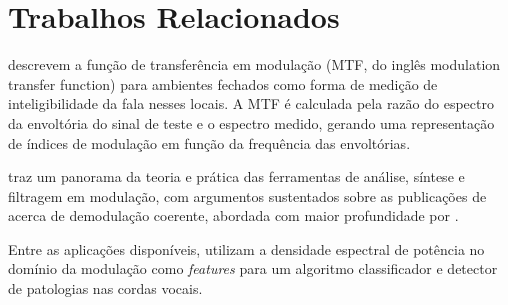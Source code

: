 \section{Trabalhos Relacionados}
\citet{houtgast1973} descrevem a função de transferência em modulação
(MTF, do inglês modulation
transfer function) para ambientes fechados como forma de medição de
inteligibilidade da fala nesses locais. A MTF é calculada pela razão do espectro
da envoltória do sinal de teste e o espectro medido, gerando uma representação
de índices de modulação em função da frequência das envoltórias.

\citet{schimmel2007} traz um panorama da teoria e prática das ferramentas de
análise, síntese e filtragem em modulação, com argumentos sustentados sobre as
publicações de \citet{atlas2005, atlas2003} acerca de demodulação coerente,
abordada com maior profundidade por \citet{clark2012}.

Entre as aplicações disponíveis, \citet{markaki2009} utilizam a densidade
espectral de potência no domínio da modulação como \textit{features} para um
algoritmo classificador e detector de patologias nas cordas vocais.